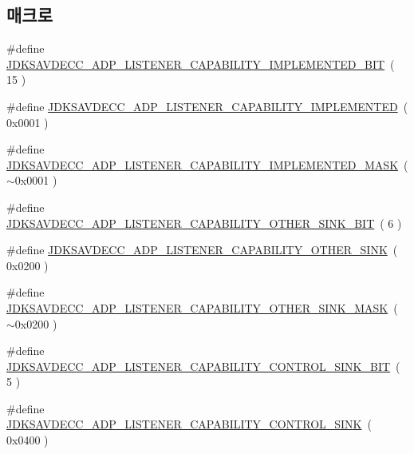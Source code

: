 \subsection*{매크로}
\begin{DoxyCompactItemize}
\item 
\#define \hyperlink{group__adp__listener__capability_gaeb6be6079a96fe1b38647afc8441fb52}{J\+D\+K\+S\+A\+V\+D\+E\+C\+C\+\_\+\+A\+D\+P\+\_\+\+L\+I\+S\+T\+E\+N\+E\+R\+\_\+\+C\+A\+P\+A\+B\+I\+L\+I\+T\+Y\+\_\+\+I\+M\+P\+L\+E\+M\+E\+N\+T\+E\+D\+\_\+\+B\+IT}~( 15 )
\item 
\#define \hyperlink{group__adp__listener__capability_ga59ffa603272755d23a2a1073a689a371}{J\+D\+K\+S\+A\+V\+D\+E\+C\+C\+\_\+\+A\+D\+P\+\_\+\+L\+I\+S\+T\+E\+N\+E\+R\+\_\+\+C\+A\+P\+A\+B\+I\+L\+I\+T\+Y\+\_\+\+I\+M\+P\+L\+E\+M\+E\+N\+T\+ED}~( 0x0001 )
\item 
\#define \hyperlink{group__adp__listener__capability_ga710ce83229a051afbbb2a89c4df01b9e}{J\+D\+K\+S\+A\+V\+D\+E\+C\+C\+\_\+\+A\+D\+P\+\_\+\+L\+I\+S\+T\+E\+N\+E\+R\+\_\+\+C\+A\+P\+A\+B\+I\+L\+I\+T\+Y\+\_\+\+I\+M\+P\+L\+E\+M\+E\+N\+T\+E\+D\+\_\+\+M\+A\+SK}~( $\sim$0x0001 )
\item 
\#define \hyperlink{group__adp__listener__capability_ga2b79303b3832bed76ba90fa8c84e0bd3}{J\+D\+K\+S\+A\+V\+D\+E\+C\+C\+\_\+\+A\+D\+P\+\_\+\+L\+I\+S\+T\+E\+N\+E\+R\+\_\+\+C\+A\+P\+A\+B\+I\+L\+I\+T\+Y\+\_\+\+O\+T\+H\+E\+R\+\_\+\+S\+I\+N\+K\+\_\+\+B\+IT}~( 6 )
\item 
\#define \hyperlink{group__adp__listener__capability_gadd3df42b7e3473ea9984d5a21aebf3bc}{J\+D\+K\+S\+A\+V\+D\+E\+C\+C\+\_\+\+A\+D\+P\+\_\+\+L\+I\+S\+T\+E\+N\+E\+R\+\_\+\+C\+A\+P\+A\+B\+I\+L\+I\+T\+Y\+\_\+\+O\+T\+H\+E\+R\+\_\+\+S\+I\+NK}~( 0x0200 )
\item 
\#define \hyperlink{group__adp__listener__capability_gab96a1d20c03244625a0ae31900720897}{J\+D\+K\+S\+A\+V\+D\+E\+C\+C\+\_\+\+A\+D\+P\+\_\+\+L\+I\+S\+T\+E\+N\+E\+R\+\_\+\+C\+A\+P\+A\+B\+I\+L\+I\+T\+Y\+\_\+\+O\+T\+H\+E\+R\+\_\+\+S\+I\+N\+K\+\_\+\+M\+A\+SK}~( $\sim$0x0200 )
\item 
\#define \hyperlink{group__adp__listener__capability_ga193e4ecba3b72a6a792b3e490b0773c0}{J\+D\+K\+S\+A\+V\+D\+E\+C\+C\+\_\+\+A\+D\+P\+\_\+\+L\+I\+S\+T\+E\+N\+E\+R\+\_\+\+C\+A\+P\+A\+B\+I\+L\+I\+T\+Y\+\_\+\+C\+O\+N\+T\+R\+O\+L\+\_\+\+S\+I\+N\+K\+\_\+\+B\+IT}~( 5 )
\item 
\#define \hyperlink{group__adp__listener__capability_gae34db60ff01123f8d796c0d231c0f1ac}{J\+D\+K\+S\+A\+V\+D\+E\+C\+C\+\_\+\+A\+D\+P\+\_\+\+L\+I\+S\+T\+E\+N\+E\+R\+\_\+\+C\+A\+P\+A\+B\+I\+L\+I\+T\+Y\+\_\+\+C\+O\+N\+T\+R\+O\+L\+\_\+\+S\+I\+NK}~( 0x0400 )

\end{DoxyCompactItemize}
